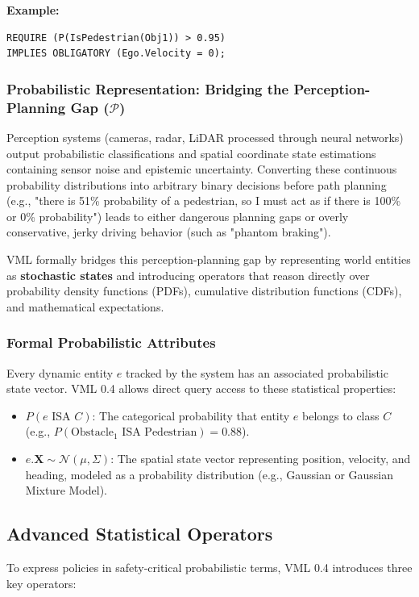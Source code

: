 \documentclass[11pt,a4paper]{article}
\begin{document}
\textbf{Example:}
\begin{lstlisting}
REQUIRE (P(IsPedestrian(Obj1)) > 0.95)
IMPLIES OBLIGATORY (Ego.Velocity = 0);
\end{lstlisting}

\subsubsection{Probabilistic Representation: Bridging the Perception-Planning Gap ($\mathcal{P}$)}

Perception systems (cameras, radar, LiDAR processed through neural networks) output probabilistic classifications and spatial coordinate state estimations containing sensor noise and epistemic uncertainty. Converting these continuous probability distributions into arbitrary binary decisions before path planning (e.g., "there is 51\% probability of a pedestrian, so I must act as if there is 100\% or 0\% probability") leads to either dangerous planning gaps or overly conservative, jerky driving behavior (such as "phantom braking").

VML formally bridges this perception-planning gap by representing world entities as \textbf{stochastic states} and introducing operators that reason directly over probability density functions (PDFs), cumulative distribution functions (CDFs), and mathematical expectations.

\subsubsection{Formal Probabilistic Attributes}
Every dynamic entity $e$ tracked by the system has an associated probabilistic state vector. VML 0.4 allows direct query access to these statistical properties:
\begin{itemize}
    \item $P(e \text{ ISA } C)$: The categorical probability that entity $e$ belongs to class $C$ (e.g., $P(\text{Obstacle}_1 \text{ ISA } \text{Pedestrian}) = 0.88$).
    \item $e.\mathbf{X} \sim \mathcal{N}(\mu, \Sigma)$: The spatial state vector representing position, velocity, and heading, modeled as a probability distribution (e.g., Gaussian or Gaussian Mixture Model).
\end{itemize}

\subsection{Advanced Statistical Operators}
To express policies in safety-critical probabilistic terms, VML 0.4 introduces three key operators:
\end{document}
